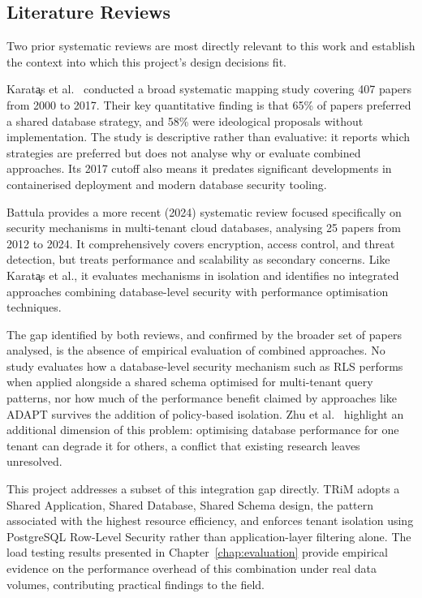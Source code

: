 \subsection*{Literature Reviews}
Two prior systematic reviews are most directly relevant to this work and
establish the context into which this project's design decisions fit.

Karat\c{a}s et al.\ \cite{karatasMultitenantArchitecturesCloud2017} conducted a broad systematic mapping study
covering 407 papers from 2000 to 2017. Their key quantitative finding is that
65\% of papers preferred a shared database strategy, and 58\% were ideological
proposals without implementation. The study is descriptive rather than evaluative:
it reports which strategies are preferred but does not analyse why or evaluate
combined approaches. Its 2017 cutoff also means it predates significant
developments in containerised deployment and modern database security tooling.

Battula \cite{battulaSystematicReviewMultitenant2024} provides a more recent (2024) systematic review focused
specifically on security mechanisms in multi-tenant cloud databases, analysing 25
papers from 2012 to 2024. It comprehensively covers encryption, access control,
and threat detection, but treats performance and scalability as secondary concerns.
Like Karat\c{a}s et al., it evaluates mechanisms in isolation and identifies no
integrated approaches combining database-level security with performance
optimisation techniques.

The gap identified by both reviews, and confirmed by the broader set of papers
analysed, is the absence of empirical evaluation of combined approaches. No study
evaluates how a database-level security mechanism such as RLS performs when applied
alongside a shared schema optimised for multi-tenant query patterns, nor how much
of the performance benefit claimed by approaches like ADAPT survives the addition
of policy-based isolation. Zhu et al.\ \cite{zhuMTRPHighPerformanceCostEfficient2024} highlight an additional
dimension of this problem: optimising database performance for one tenant can
degrade it for others, a conflict that existing research leaves unresolved.

This project addresses a subset of this integration gap directly. TRiM adopts a
Shared Application, Shared Database, Shared Schema design, the pattern associated
with the highest resource efficiency, and enforces tenant isolation using
PostgreSQL Row-Level Security rather than application-layer filtering alone.
The load testing results presented in Chapter~\ref{chap:evaluation} provide
empirical evidence on the performance overhead of this combination under
real data volumes, contributing practical findings to the field.